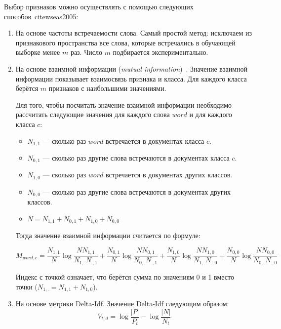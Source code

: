 Выбор признаков можно осуществлять с помощью следующих способов~cite{wseas2005}:
\begin{enumerate}

\item
На основе частоты встречаемости слова. Самый простой метод: исключаем
из признакового пространства все слова, которые встречались в обучающей
выборке менее $m$ раз. Число $m$ подбирается экспериментально.

\item
На основе взаимной информации (\textit{mutual information})~\cite{mutualinformation}.
Значение взаимной информации показывает взаимосвязь признака
и класса. Для каждого класса берётся $m$ признаков с наибольшими значениями.

Для того, чтобы посчитать значение взаимной информации необходимо рассчитать
следующие значения для каждого слова $word$ и для каждого класса $c$:
\begin{itemize}

\item $N_{1,1}$ --- сколько раз $word$ встречается в документах класса $c$.

\item $N_{0,1}$ --- сколько раз другие слова встречаются в документах класса $c$.

\item $N_{1,0}$ --- сколько раз $word$ встречается в документах других классов.

\item $N_{0,0}$ --- сколько раз другие слова встречаются в документах других классов.

\item $N = N_{1,1} + N_{0,1} + N_{1,0} + N_{0,0}$

\end{itemize}

Тогда значение взаимной информации считается по формуле:

\begin{equation}
M_{word, c} = 
\frac{N_{1,1}}{N} \log \frac{N N_{1,1}} {N_{1,.} N_{.,1}} +
\frac{N_{0,1}}{N} \log \frac{N N_{0,1}} {N_{0,.} N_{.,1}} +
\frac{N_{1,0}}{N} \log \frac{N N_{1,0}} {N_{1,.} N_{.,0}} +
\frac{N_{0,0}}{N} \log \frac{N N_{0,0}} {N_{0,.} N_{.,0}}
\end{equation}

Индекс с точкой означает, что берётся сумма по значениям 0 и 1 вместо точки 
($N_{1, .} = N_{1, 1} + N_{1, 0}$).

\item
На основе метрики Delta-Idf. Значение Delta-Idf следующим образом:
\begin{equation}
V_{t, d} = \log \frac{|P|}{P_t} - \log \frac{|N|}{N_t}
\end{equation}


\end{enumerate}
